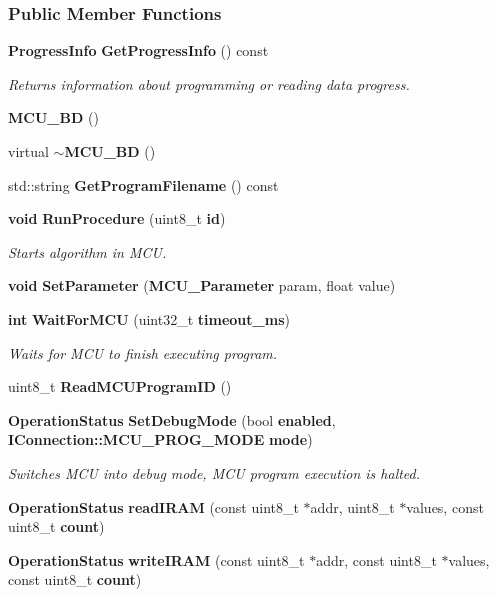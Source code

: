 \subsubsection*{Public Member Functions}
\begin{DoxyCompactItemize}
\item 
{\bf Progress\+Info} {\bf Get\+Progress\+Info} () const 
\begin{DoxyCompactList}\small\item\em Returns information about programming or reading data progress. \end{DoxyCompactList}\item 
{\bf M\+C\+U\+\_\+\+BD} ()
\item 
virtual {\bf $\sim$\+M\+C\+U\+\_\+\+BD} ()
\item 
std\+::string {\bf Get\+Program\+Filename} () const 
\item 
{\bf void} {\bf Run\+Procedure} (uint8\+\_\+t {\bf id})
\begin{DoxyCompactList}\small\item\em Starts algorithm in M\+CU. \end{DoxyCompactList}\item 
{\bf void} {\bf Set\+Parameter} ({\bf M\+C\+U\+\_\+\+Parameter} param, float value)
\item 
{\bf int} {\bf Wait\+For\+M\+CU} (uint32\+\_\+t {\bf timeout\+\_\+ms})
\begin{DoxyCompactList}\small\item\em Waits for M\+CU to finish executing program. \end{DoxyCompactList}\item 
uint8\+\_\+t {\bf Read\+M\+C\+U\+Program\+ID} ()
\item 
{\bf Operation\+Status} {\bf Set\+Debug\+Mode} (bool {\bf enabled}, {\bf I\+Connection\+::\+M\+C\+U\+\_\+\+P\+R\+O\+G\+\_\+\+M\+O\+DE} {\bf mode})
\begin{DoxyCompactList}\small\item\em Switches M\+CU into debug mode, M\+CU program execution is halted. \end{DoxyCompactList}\item 
{\bf Operation\+Status} {\bf read\+I\+R\+AM} (const uint8\+\_\+t $\ast$addr, uint8\+\_\+t $\ast$values, const uint8\+\_\+t {\bf count})
\item 
{\bf Operation\+Status} {\bf write\+I\+R\+AM} (const uint8\+\_\+t $\ast$addr, const uint8\+\_\+t $\ast$values, const uint8\+\_\+t {\bf count})
\item 

\end{DoxyCompactItemize}
